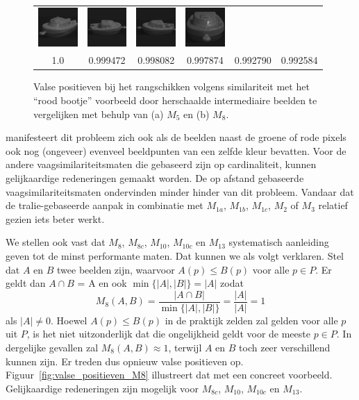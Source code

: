\begin{figure}[!bp]
{\begin{tabular}{cccccc}
\includegraphics[width=1.5cm]{coil/beeld-29.eps} &
\includegraphics[width=1.5cm]{coil/beeld-27.eps} &
\includegraphics[width=1.5cm]{coil/beeld-24.eps} &
\includegraphics[width=1.5cm]{coil/beeld-28.eps} \\
{\scriptsize 1.0} & 
{\scriptsize 0.999472} & 
{\scriptsize 0.998082} & 
{\scriptsize 0.997874} & 
{\scriptsize 0.992790} &
{\scriptsize 0.992584} 
\end{tabular}
\label{fig:valse_positieven_M8}
}
\caption{\label{fig:valse_positieven}Valse positieven bij het rangschikken volgens similariteit met 
het ``rood bootje'' voorbeeld door herschaalde intermediaire beelden te vergelijken met behulp van 
(a) $M_5$ en (b) $M_8$.}
\end{figure}
manifesteert dit probleem zich ook als de 
beelden naast de groene of rode pixels ook nog (ongeveer) evenveel beeldpunten van een zelfde kleur bevatten. 
Voor de andere vaagsimilariteitsmaten die gebaseerd zijn op cardinaliteit, kunnen gelijkaardige redeneringen 
gemaakt worden. De op afstand gebaseerde vaagsimilariteitsmaten ondervinden minder hinder van dit probleem. 
Vandaar dat de tralie-gebaseerde aanpak in combinatie met
$M_{1a}$, $M_{1b}$, $M_{1c}$, $M_{2}$ of $M_{3}$ relatief gezien iets beter werkt.

We stellen ook vast dat $M_8$, $M_{8c}$, $M_{10}$, $M_{10c}$ en $M_{13}$ systematisch aanleiding
geven tot de minst performante maten. Dat kunnen we als volgt verklaren. Stel dat $A$ en $B$
twee beelden zijn, waarvoor $A(p) \le B(p)$ voor alle
$p \in P$. Er geldt dan $A \cap B$ = A en ook $\min\{|A|,|B|\}=|A|$ zodat
\begin{displaymath}
M_8(A,B)= \frac{|A \cap B|}{\min\{|A|,|B|\}} = \frac{|A|}{|A|} = 1
\end{displaymath}
als $|A| \ne 0$. Hoewel $A(p) \le B(p)$ in de praktijk zelden zal gelden voor alle $p$ uit $P$, 
is het niet uitzonderlijk dat die ongelijkheid geldt voor de meeste $p \in P$. In dergelijke 
gevallen zal $M_8(A,B) \approx 1$, terwijl $A$ en $B$ toch 
zeer verschillend kunnen zijn. Er treden dus opnieuw valse positieven op. Figuur~\ref{fig:valse_positieven_M8}
illustreert dat met een concreet voorbeeld. Gelijkaardige redeneringen zijn mogelijk voor $M_{8c}$, $M_{10}$, 
$M_{10c}$ en $M_{13}$.

